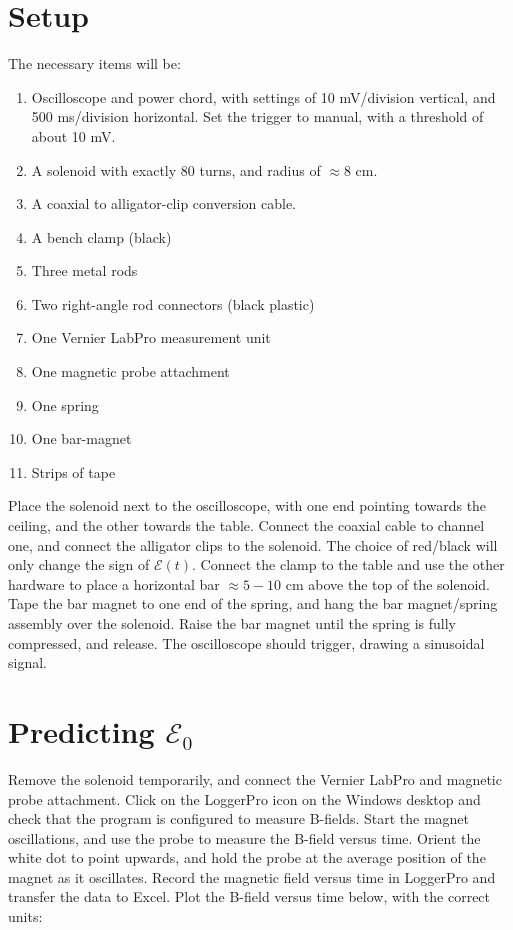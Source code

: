 \documentclass[12pt]{article}
\begin{document}
\section{Setup}

The necessary items will be:

\begin{enumerate}
\item Oscilloscope and power chord, with settings of 10 mV/division vertical, and 500 ms/division horizontal.  Set the trigger to manual, with a threshold of about 10 mV.
\item A solenoid with exactly 80 turns, and radius of $\approx 8$ cm.
\item A coaxial to alligator-clip conversion cable.
\item A bench clamp (black)
\item Three metal rods
\item Two right-angle rod connectors (black plastic)
\item One Vernier LabPro measurement unit
\item One magnetic probe attachment
\item One spring
\item One bar-magnet
\item Strips of tape
\end{enumerate}

Place the solenoid next to the oscilloscope, with one end pointing towards the ceiling, and the other towards the table.  Connect the coaxial cable to channel one, and connect the alligator clips to the solenoid.  The choice of red/black will only change the sign of $\mathcal{E}(t)$.  Connect the clamp to the table and use the other hardware to place a horizontal bar $\approx 5-10$ cm above the top of the solenoid.  Tape the bar magnet to one end of the spring, and hang the bar magnet/spring assembly over the solenoid.  Raise the bar magnet until the spring is fully compressed, and release.  The oscilloscope should trigger, drawing a sinusoidal signal.

\section{Predicting $\mathcal{E}_0$}

Remove the solenoid temporarily, and connect the Vernier LabPro and magnetic probe attachment.  Click on the LoggerPro icon on the Windows desktop and check that the program is configured to measure B-fields. Start the magnet oscillations, and use the probe to measure the B-field versus time.  Orient the white dot to point upwards, and hold the probe at the average position of the magnet as it oscillates.  Record the magnetic field versus time in LoggerPro and transfer the data to Excel.  Plot the B-field versus time below, with the correct units: \\ \vspace{3cm}
\end{document}
